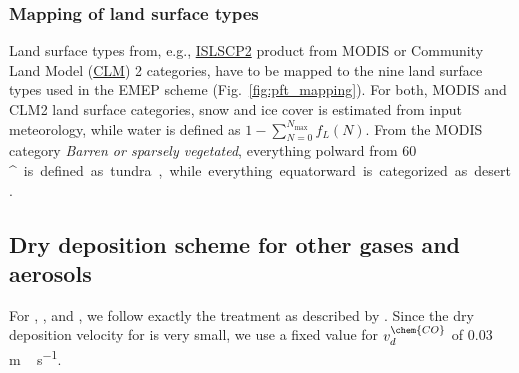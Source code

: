 \documentclass[gmd, manuscript]{copernicus}
\begin{document}
\subsubsection*{Mapping of land surface types}
Land surface types from, e.g., \href{https://daac.ornl.gov/cgi-bin/dataset_lister.pl?p=29}{ISLSCP2} product from MODIS or Community Land Model (\href{http://www.cgd.ucar.edu/tss/clm/}{CLM}) 2 categories, have to be mapped to the nine land surface types used in the EMEP scheme (Fig.~\ref{fig:pft_mapping}). For both, MODIS and CLM2 land surface categories, snow and ice cover is estimated from input meteorology, while water is defined as $1-\sum_{N=0}^{N_\text{max}} f_L(N)$. From the MODIS category \emph{Barren or sparsely vegetated}, everything polward from 60\,\unit{^\circ} is defined as tundra, while everything equatorward is categorized as desert.

\subsection{Dry deposition scheme for other gases and aerosols}
For , , and , we follow exactly the treatment as described by \citet{ACP:Simpson2012}. Since the dry deposition velocity for  is very small, we use a fixed value for $v_d^\chem{CO}$ of 0.03\,\unit{m\,s^{-1}}.
\end{document}
